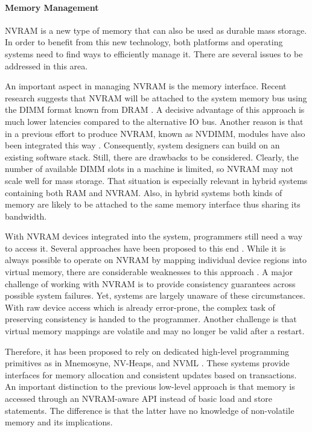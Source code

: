 \paragraph{Memory Management}

NVRAM is a new type of memory that can also be used as durable mass storage. In
order to benefit from this new technology, both platforms and operating systems
need to find ways to efficiently manage it. There are several issues to be
addressed in this area.


An important aspect in managing NVRAM is the memory interface. Recent research
suggests that NVRAM will be attached to the system memory bus using the DIMM
format known from DRAM \cite{volos2017whisper, oukid2017data, andrei2017sap,
intel2017nvdimm}. A decisive advantage of this approach is much lower latencies
compared to the alternative IO bus. Another reason is that in a previous effort
to produce NVRAM, known as NVDIMM, modules have also been integrated this way
\cite{dulloor2014system, huang2014design}. Consequently, system designers can
build on an existing software stack. Still, there are drawbacks to be
considered. Clearly, the number of available DIMM slots in a machine is limited,
so NVRAM may not scale well for mass storage. That situation is especially
relevant in hybrid systems containing both RAM and NVRAM. Also, in hybrid
systems both kinds of memory are likely to be attached to the same memory
interface thus sharing its bandwidth.

With NVRAM devices integrated into the system, programmers still need a way to
access it. Several approaches have been proposed to this end
\cite{volos2017whisper}. While it is always possible to operate on NVRAM by
mapping individual device regions into virtual memory, there are considerable
weaknesses to this approach \cite{condit2009better, volos2011mnemosyne,
dulloor2014system, volos2017whisper}. A major challenge of working with NVRAM is
to provide consistency guarantees across possible system failures. Yet, systems
are largely unaware of these circumstances. With raw device access which is
already error-prone, the complex task of preserving consistency is handed to the
programmer. Another challenge is that virtual memory mappings are volatile and
may no longer be valid after a restart.

Therefore, it has been proposed to rely on dedicated high-level programming
primitives as in Mnemosyne, NV-Heaps, and NVML \cite{volos2011mnemosyne,
coburn2011nv_heaps, intel2017nvml}. These systems provide interfaces for memory
allocation and consistent updates based on transactions. An important
distinction to the previous low-level approach is that memory is accessed
through an NVRAM-aware API instead of basic load and store statements. The
difference is that the latter have no knowledge of non-volatile memory and its
implications.


